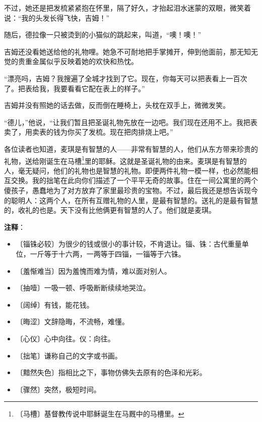 \documentclass[12pt,UTF-8,openany]{ctexbook}
\begin{document}
\begin{large}
    不过，她还是把发梳紧紧抱在怀里，隔了好久，才抬起泪水迷蒙的双眼，微笑着说：“我的头发长得飞快，吉姆！”
    
    随后，德拉像一只被烫到的小猫似的跳起来，叫道，“噢！噢！”
    
    吉姆还没看她送给他的礼物哩。她急不可耐地把手掌摊开，伸到他面前，那无知无觉的贵重金属似乎反映着她的欢快和热忱。
    
    “漂亮吗，吉姆？我搜遍了全城才找到了它。现在，你每天可以把表看上一百次了。把表给我，我要看看它配在表上的样子。”
    
    吉姆并没有照她的话去做，反而倒在睡椅上，头枕在双手上，微微发笑。
    
    “德儿，”他说，“让我们暂且把圣诞礼物先放在一边吧。我们现在还用不上。我把表卖了，用卖表的钱为你买了发梳。现在把肉排烧上吧。”
    
    各位读者也知道，麦琪是有智慧的人——非常有智慧的人，他们从东方带来珍贵的礼物，送给刚诞生在马槽\footnote{〔马槽〕基督教传说中耶稣诞生在马厩中的马槽里。}里的耶稣。这就是圣诞礼物的由来。麦琪是有智慧的人，毫无疑问，他们的礼物也是智慧的礼物。即便两件礼物一模一样，也必然能相互交换。我的拙笔在此向你们描述了一个平平无奇的故事。住在一间公寓里的两个傻孩子，愚蠢地为了对方放弃了家里最珍贵的宝物。不过，最后我还是想告诉现今的聪明人：这两个人，在所有互赠礼物的人里，是最有智慧的。送礼的是最有智慧的，收礼的也是。天下没有比他俩更有智慧的人了。他们就是麦琪。
    
\end{large}


\newpage

\textbf{注释}：

\vspace{-1em}

\begin{itemize}
    \setlength\itemsep{-0.2em}
    \item 〔锱铢必较〕为很少的钱或很小的事计较，不肯退让。锱、铢：古代重量单位，一斤等于十六两，一两等于四锱，一锱等于六铢。
    \item 〔羞惭难当〕因为羞愧而难为情，难以面对别人。
    \item 〔抽噎〕一吸一顿、呼吸断断续续地哭泣。
    \item 〔阔绰〕有钱，能花钱。
    \item 〔晦涩〕文辞隐晦，不流畅，难懂。
    \item 〔心仪〕心中向往。仪：向往。
    \item 〔拙笔〕谦称自己的文字或书画。
    \item 〔黯然失色〕指相比之下，事物仿佛失去原有的色泽和光彩。
    \item 〔骤然〕突然，极短时间。
\end{itemize}
\end{document}
